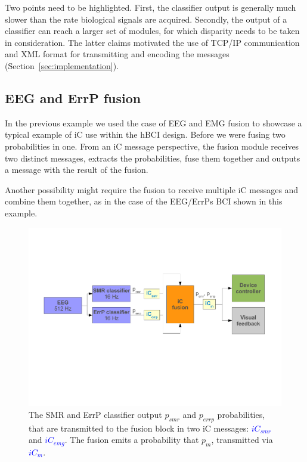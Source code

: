 \documentclass[a4paper,10pt]{article}
\newcommand{\temp}[1]{\textcolor{blue}{\textbf{#1}}}
\begin{document}
Two points need to be highlighted. First, the classifier output is generally
much slower than the rate biological signals are acquired. Secondly, the output
of a classifier can reach a larger set of modules, for which disparity needs to
be taken in consideration. 
The latter claims motivated the use of TCP/IP communication and XML format for
transmitting and encoding the messages (Section~\ref{sec:implementation}).

\subsection{EEG and ErrP fusion}
\label{sec:hbci:example2}
In the previous example we used the case of EEG and EMG fusion to showcase a
typical example of iC use within the hBCI design. 
Before we were fusing two probabilities in one. From an iC message perspective,
the fusion module receives two distinct messages, extracts the probabilities,
fuse them together and outputs a message with the result of the fusion.

Another possibility might require the fusion to receive multiple iC messages and
combine them together, as in the case of the EEG/ErrPs BCI shown in this
example.
\label{sec:hbci:example2}
\begin{figure}[!htb]
  \begin{center}
	\includegraphics[width=\textwidth]{figures/example2.pdf}
	\caption{The SMR and ErrP classifier output $p_{smr}$ and $p_{errp}$
	probabilities, that are transmitted to the fusion block in two iC messages: 
	\temp{$iC_{smr}$} and \temp{$iC_{emg}$}. The fusion emits a probability that
	$p_{m}$, transmitted via \temp{$iC_{m}$}.}
	\label{fig:hbci:example2}
  \end{center}
\end{figure}
\end{document}
